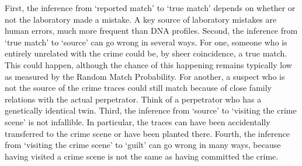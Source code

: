\documentclass[10pt]{article}
\begin{document}
First, the inference from `reported match' to `true match' depends on whether or not 
the laboratory made a mistake. A key source of laboratory mistakes are human errors, much more frequent than DNA profiles.
Second, the inference from `true match' to `source' can go wrong in several ways. For one, 
someone who is entirely unrelated with the crime could 
be, by sheer coincidence, a true match. This could happen, although the chance of this happening remains typically low as 
measured by the Random Match Probability. For another, a suspect who is not 
the source of the crime traces could still match because of close family relations with the actual perpetrator. 
Think of a perpetrator who has a genetically identical twin. %
Third, the inference from `source' to `visiting the crime scene' is not infallible. In particular, the traces can have been accidentally transferred to the crime scene or have been planted there. Fourth, the inference from `visiting the crime scene' to `guilt' can go wrong in many ways, because having visited a crime scene is not the same as having committed the crime.

\end{document}
